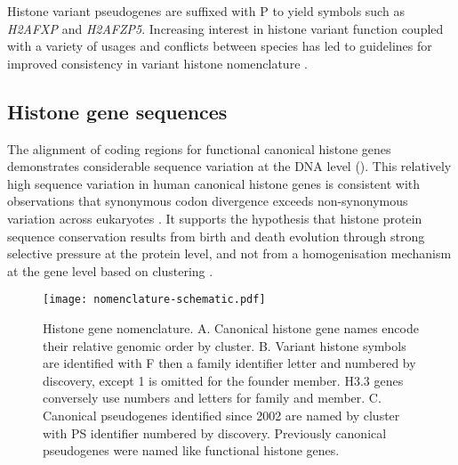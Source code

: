 	Histone variant pseudogenes are suffixed with P to yield symbols such as \textit{H2AFXP} and \textit{H2AFZP5}.
	Increasing interest in histone variant function \citep{MazeAllis2014}
	coupled with a variety of usages and conflicts between species 
	has led to guidelines for improved consistency in variant histone nomenclature \citep{Talbert2012}.

  \subsection{Histone gene sequences}

	The alignment of coding regions for functional canonical histone genes 
	demonstrates considerable sequence variation at the DNA level (). 
	This relatively high sequence variation in human canonical histone genes 
	is consistent with observations that 
	synonymous codon divergence exceeds non-synonymous variation 
	across eukaryotes \citep{Piontkivska2002} \citep{Rooney2002}. 
	It supports the hypothesis that histone protein sequence conservation 
	results from birth and death evolution through strong selective pressure at the protein level, 
	and not from a homogenisation mechanism at the gene level based on clustering \citep{NeiRooney2005}.

    \begin{figure*}
      \centering
      \texttt{[image: nomenclature-schematic.pdf]}
      \caption{Histone gene nomenclature. 
	  A. Canonical histone gene names encode their relative genomic order by cluster. 
	  B. Variant histone symbols are identified with F then a family identifier letter
	  and numbered by discovery, except 1 is omitted for the founder member.
	  H3.3 genes conversely use numbers and letters for family and member.
	  C. Canonical pseudogenes identified since 2002 are named by cluster with PS identifier numbered by discovery. 
	  Previously canonical pseudogenes were named like functional histone genes.}
      \label{fig:nomenclature}
    \end{figure*}

